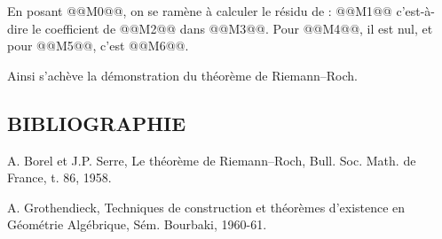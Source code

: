 
En
posant @@M0@@, on se ramène à calculer le résidu de :
@@M1@@
c'est-à-dire le coefficient de @@M2@@ dans @@M3@@. Pour @@M4@@, il est nul, et pour @@M5@@, c'est @@M6@@.

Ainsi s'achève la démonstration du théorème de Riemann--Roch.

\subsection*{BIBLIOGRAPHIE}
\begin{enumerate}[label={[\arabic*]}]
\item A. Borel et J.P. Serre, Le théorème de Riemann--Roch, Bull. Soc. Math. de France, t. 86, 1958.
\item A. Grothendieck, Techniques de construction et théorèmes d'existence en Géométrie Algébrique, Sém. Bourbaki, 1960-61.
\end{enumerate}




